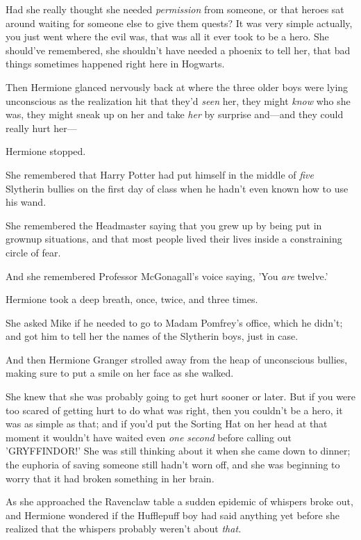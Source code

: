 Had she really thought she needed \emph{permission} from someone, or that 
heroes sat around waiting for someone else to give them quests? It was very 
simple actually, you just went where the evil was, that was all it ever took to 
be a hero. She should've remembered, she shouldn't have needed a phoenix to 
tell her, that bad things sometimes happened right here in Hogwarts.

Then Hermione glanced nervously back at where the three older boys were lying 
unconscious as the realization hit that they'd \emph{seen} her, they might 
\emph{know} who she was, they might sneak up on her and take \emph{her} by 
surprise and---and they could really hurt her---

Hermione stopped.

She remembered that Harry Potter had put himself in the middle of \emph{five} 
Slytherin bullies on the first day of class when he hadn't even known how to 
use his wand.

She remembered the Headmaster saying that you grew up by being put in grownup 
situations, and that most people lived their lives inside a constraining circle 
of fear.

And she remembered Professor McGonagall's voice saying, 'You \emph{are} twelve.'

Hermione took a deep breath, once, twice, and three times.

She asked Mike if he needed to go to Madam Pomfrey's office, which he didn't; 
and got him to tell her the names of the Slytherin boys, just in case.

And then Hermione Granger strolled away from the heap of unconscious bullies, 
making sure to put a smile on her face as she walked.

She knew that she was probably going to get hurt sooner or later. But if you 
were too scared of getting hurt to do what was right, then you couldn't be a 
hero, it was as simple as that; and if you'd put the Sorting Hat on her head at 
that moment it wouldn't have waited even \emph{one second} before calling out 
'GRYFFINDOR!'
\sbreak
She was still thinking about it when she came down to dinner; the euphoria of 
saving someone still hadn't worn off, and she was beginning to worry that it 
had broken something in her brain.

As she approached the Ravenclaw table a sudden epidemic of whispers broke out, 
and Hermione wondered if the Hufflepuff boy had said anything yet before she 
realized that the whispers probably weren't about \emph{that.}

